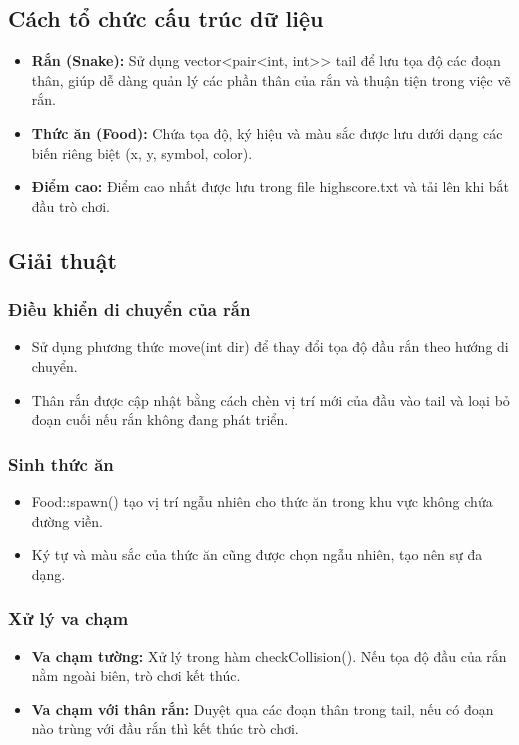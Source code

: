 \documentclass[a4paper,12pt]{article}
\begin{document}
\subsection{Cách tổ chức cấu trúc dữ liệu}
\begin{itemize}
    \item \textbf{Rắn (Snake):} Sử dụng vector<pair<int, int>> tail để lưu tọa độ các đoạn thân, giúp dễ dàng quản lý các phần thân của rắn và thuận tiện trong việc vẽ rắn.
    \item \textbf{Thức ăn (Food):} Chứa tọa độ, ký hiệu và màu sắc được lưu dưới dạng các biến riêng biệt (x, y, symbol, color).
    \item \textbf{Điểm cao:} Điểm cao nhất được lưu trong file highscore.txt và tải lên khi bắt đầu trò chơi.
\end{itemize}

\subsection{Giải thuật}

\subsubsection{Điều khiển di chuyển của rắn}
\begin{itemize}
    \item Sử dụng phương thức move(int dir) để thay đổi tọa độ đầu rắn theo hướng di chuyển.
    \item Thân rắn được cập nhật bằng cách chèn vị trí mới của đầu vào tail và loại bỏ đoạn cuối nếu rắn không đang phát triển.
\end{itemize}

\subsubsection{Sinh thức ăn}
\begin{itemize}
    \item Food::spawn() tạo vị trí ngẫu nhiên cho thức ăn trong khu vực không chứa đường viền.
    \item Ký tự và màu sắc của thức ăn cũng được chọn ngẫu nhiên, tạo nên sự đa dạng.
\end{itemize}

\subsubsection{Xử lý va chạm}
\begin{itemize}
    \item \textbf{Va chạm tường:} Xử lý trong hàm checkCollision(). Nếu tọa độ đầu của rắn nằm ngoài biên, trò chơi kết thúc.
    \item \textbf{Va chạm với thân rắn:} Duyệt qua các đoạn thân trong tail, nếu có đoạn nào trùng với đầu rắn thì kết thúc trò chơi.
\end{itemize}
\end{document}
